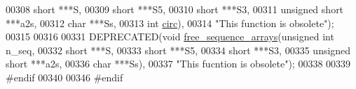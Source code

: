 \begin{DoxyCode}
00308                                        \textcolor{keywordtype}{short}          ***S,
00309                                        \textcolor{keywordtype}{short}          ***S5,
00310                                        \textcolor{keywordtype}{short}          ***S3,
00311                                        \textcolor{keywordtype}{unsigned} \textcolor{keywordtype}{short} ***a2s,
00312                                        \textcolor{keywordtype}{char}           ***Ss,
00313                                        \textcolor{keywordtype}{int}            \hyperlink{group__model__details_gaf9202a1a09f5828dc731e2d9a10fa111}{circ}),
00314           \textcolor{stringliteral}{"This function is obsolete"});
00315 
00316 
00331 DEPRECATED(\textcolor{keywordtype}{void}  \hyperlink{group__aln__utils_ga298a420a8c879202e2617b3f724fde38}{free\_sequence\_arrays}(\textcolor{keywordtype}{unsigned} \textcolor{keywordtype}{int}    n\_seq,
00332                                       \textcolor{keywordtype}{short}           ***S,
00333                                       \textcolor{keywordtype}{short}           ***S5,
00334                                       \textcolor{keywordtype}{short}           ***S3,
00335                                       \textcolor{keywordtype}{unsigned} \textcolor{keywordtype}{short}  ***a2s,
00336                                       \textcolor{keywordtype}{char}            ***Ss),
00337           \textcolor{stringliteral}{"This fucntion is obsolete"});
00338 
00339 \textcolor{preprocessor}{#endif}
00340 
00346 \textcolor{preprocessor}{#endif}
\end{DoxyCode}
